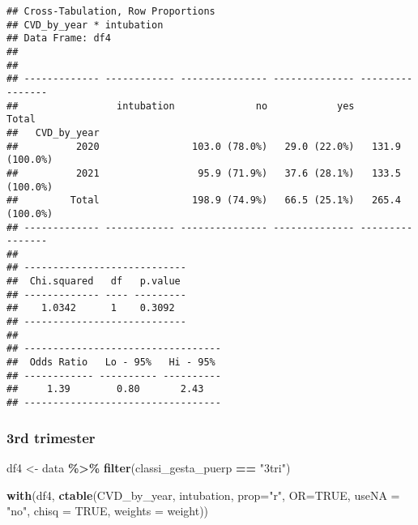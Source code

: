 \documentclass[
]{article}
\newenvironment{Shaded}{\begin{snugshade}}{\end{snugshade}}
\newcommand{\AttributeTok}[1]{\textcolor[rgb]{0.13,0.29,0.53}{#1}}
\newcommand{\ConstantTok}[1]{\textcolor[rgb]{0.56,0.35,0.01}{#1}}
\newcommand{\FunctionTok}[1]{\textcolor[rgb]{0.13,0.29,0.53}{\textbf{#1}}}
\newcommand{\NormalTok}[1]{#1}
\newcommand{\OtherTok}[1]{\textcolor[rgb]{0.56,0.35,0.01}{#1}}
\newcommand{\SpecialCharTok}[1]{\textcolor[rgb]{0.81,0.36,0.00}{\textbf{#1}}}
\newcommand{\StringTok}[1]{\textcolor[rgb]{0.31,0.60,0.02}{#1}}
\begin{document}
\begin{verbatim}
## Cross-Tabulation, Row Proportions  
## CVD_by_year * intubation  
## Data Frame: df4  
## 
## 
## ------------- ------------ --------------- -------------- ----------------
##                 intubation              no            yes            Total
##   CVD_by_year                                                             
##          2020                103.0 (78.0%)   29.0 (22.0%)   131.9 (100.0%)
##          2021                 95.9 (71.9%)   37.6 (28.1%)   133.5 (100.0%)
##         Total                198.9 (74.9%)   66.5 (25.1%)   265.4 (100.0%)
## ------------- ------------ --------------- -------------- ----------------
## 
## ----------------------------
##  Chi.squared   df   p.value 
## ------------- ---- ---------
##    1.0342      1    0.3092  
## ----------------------------
## 
## ----------------------------------
##  Odds Ratio   Lo - 95%   Hi - 95% 
## ------------ ---------- ----------
##     1.39        0.80       2.43   
## ----------------------------------
\end{verbatim}

\hypertarget{rd-trimester-10}{%
\subsubsection{3rd trimester}\label{rd-trimester-10}}

\begin{Shaded}
\begin{Highlighting}[]
\NormalTok{df4 }\OtherTok{\textless{}{-}}\NormalTok{ data }\SpecialCharTok{\%\textgreater{}\%} 
  \FunctionTok{filter}\NormalTok{(classi\_gesta\_puerp }\SpecialCharTok{==} \StringTok{"3tri"}\NormalTok{)}

\FunctionTok{with}\NormalTok{(df4, }\FunctionTok{ctable}\NormalTok{(CVD\_by\_year, intubation, }\AttributeTok{prop=}\StringTok{"r"}\NormalTok{, }\AttributeTok{OR=}\ConstantTok{TRUE}\NormalTok{, }\AttributeTok{useNA =} \StringTok{"no"}\NormalTok{, }\AttributeTok{chisq =} \ConstantTok{TRUE}\NormalTok{, }\AttributeTok{weights =}\NormalTok{ weight))}
\end{Highlighting}
\end{Shaded}
\end{document}
